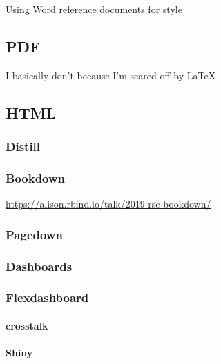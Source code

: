 \documentclass[]{book}
\let\oldparagraph\paragraph
\renewcommand{\paragraph}[1]{\oldparagraph{#1}\mbox{}}
\begin{document}
Using Word reference documents for style

\hypertarget{pdf}{%
\subsection{PDF}\label{pdf}}

I basically don't because I'm scared off by LaTeX

\hypertarget{html}{%
\subsection{HTML}\label{html}}

\hypertarget{distill}{%
\subsubsection{Distill}\label{distill}}

\hypertarget{bookdown}{%
\subsubsection{Bookdown}\label{bookdown}}

\url{https://alison.rbind.io/talk/2019-rsc-bookdown/}

\hypertarget{pagedown}{%
\subsubsection{Pagedown}\label{pagedown}}

\hypertarget{dashboards}{%
\subsubsection{Dashboards}\label{dashboards}}

\hypertarget{flexdashboard}{%
\subsubsection{Flexdashboard}\label{flexdashboard}}

\hypertarget{crosstalk}{%
\paragraph{crosstalk}\label{crosstalk}}

\hypertarget{shiny}{%
\paragraph{Shiny}\label{shiny}}
\end{document}
